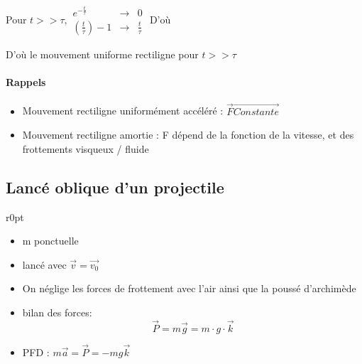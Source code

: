 Pour $t >> \tau, \begin{array}{rcl}
e^{-\frac{t}{\tau}} &\rightarrow& 0 \\
(\frac{t}{\tau})-1 &\rightarrow& \frac{t}{\tau}
\end{array}$ D'où ~\\
\begin{center}\end{center}
D'où le mouvement uniforme rectiligne pour $t >> \tau$

\paragraph{Rappels}
\begin{itemize}
\item Mouvement rectiligne uniformément accéléré : $\vec{F} \overrightarrow{Constante}$
\item Mouvement rectiligne amortie : F dépend de la fonction de la vitesse, et des frottements visqueux / fluide
\end{itemize}

\subsection{Lancé oblique d'un projectile}

\begin{wrapfigure}[8]{r}{0pt}
\end{wrapfigure}

\begin{itemize}
	\item m ponctuelle
	\item lancé avec $\vec{v} = \vec{v_0}$
	\item On néglige les forces de frottement avec l'air ainsi que la poussé d'archimède
	\item bilan des forces: \[\vec{P} = m \vec{g} = m \cdot g \cdot \vec{k}\]
	\item PFD : $m\vec{a} = \vec{P} = -mg\vec{k}$
\end{itemize}

